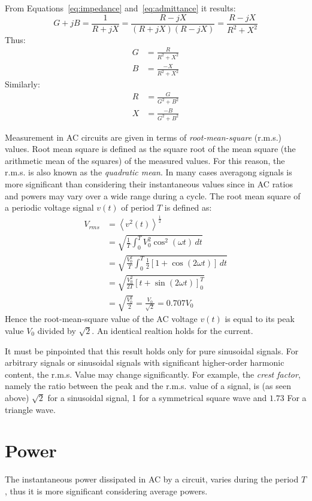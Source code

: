 From Equations~\ref{eq:impedance} and~\ref{eq:admittance} it results:
\begin{equation}
G + jB = \frac{1}{R + jX} = \frac{R - jX}{(R + jX)(R - jX)} = \frac{R - jX}{R^2 + X^2}
\end{equation}
Thus:
\begin{align*} 
G &=  \frac{R}{R^2 + X^2}\\ 
B &=  \frac{-X}{R^2 + X^2}
\end{align*}
Similarly:
\begin{align*} 
R &=  \frac{G}{G^2 + B^2}\\ 
X &=  \frac{-B}{G^2 + B^2}
\end{align*}


Measurement in AC circuits are given in terms of \emph{root-mean-square} (r.m.s.) values. Root mean square is defined as the square root of the mean square (the arithmetic mean of the squares) of the measured values. For this reason, the r.m.s. is also known as the \emph{quadratic mean}. In many cases averagong signals is more significant than considering their instantaneous values since in AC ratios and powers may vary over a wide range during a cycle. The root mean square of a periodic voltage signal $v(t)$ of period $T$ is defined as:
\begin{align*}
V_{rms} & = \left\langle v^2(t)\right\rangle^{\frac{1}{2}}\\ 
        & = \sqrt{\frac{1}{T}\int_0^TV_0^2\cos^2(\omega t)\,dt} \\
        & = \sqrt{\frac{V_0^2}{T}\int_0^T\frac{1}{2}\left[1 + \cos(2\omega t)\right]\,dt} \\
        & = \sqrt{\frac{V_0^2}{2T}\left[t + \sin(2\omega t)\right]_0^T}\\
        & = \sqrt{\frac{V_0^2}{2}} = \frac{V_0}{\sqrt{2}} = 0.707V_0
\end{align*}
Hence the root-mean-square value of the AC voltage $v(t)$ is equal to its peak value $V_0$ divided by $\sqrt{2}$. An identical realtion holds for the current.

It must be pinpointed that this result holds only for pure sinusoidal signals. For arbitrary signals or sinusoidal signals with significant higher-order harmonic content, the r.m.s. Value may change significantly. For example, the \emph{crest factor}, namely the ratio between the peak and the r.m.s. value of a signal, is (as seen above) $\sqrt{2}$ for a sinusoidal signal, 1 for a symmetrical square wave and $1.73$ For a triangle wave. 

\section{Power}
The instantaneous power dissipated in AC by a circuit, varies during the period $T$, thus it is more significant considering average powers.

